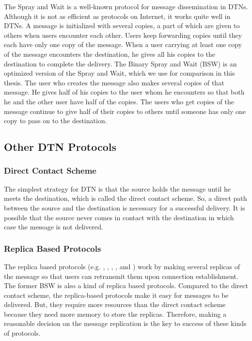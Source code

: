 \noindent The Spray and Wait \cite{C31} is a well-known protocol for message dissemination in DTNs. Although it is not as efficient as protocols on Internet, it works quite well in DTNs. A message is initialized with several copies, a part of which are given to others when users encounter each other. Users keep forwarding copies until they each have only one copy of the message. When a user carrying at least one copy of the message encounters the destination, he gives all his copies to the destination to complete the delivery. The Binary Spray and Wait (BSW) \cite{C31} is an optimized version of the Spray and Wait, which we use for comparison in this thesis. The user who creates the message also makes several copies of that message. He gives half of his copies to the user whom he encounters so that both he and the other user have half of the copies. The users who get copies of the message continue to give half of their copies to others until someone has only one copy to pass on to the destination.

\subsection{ Other DTN Protocols}


\subsubsection{ Direct Contact Scheme}

\noindent The simplest strategy for DTN is that the source holds the message until he meets the destination, which is called the direct contact scheme. So, a direct path between the source and the destination is necessary for a successful delivery. It is possible that the source never comes in contact with the destination in which case the message is not delivered. 


\subsubsection{ Replica Based Protocols}

\noindent The replica based protocols (e.g. \cite{C6}, \cite{C7}, \cite{C8}, \cite{C9}, and \cite{C10}) work by making several replicas of the message so that users can retransmit them upon connection establishment. The former BSW is also a kind of replica based protocols. Compared to the direct contact scheme, the replica-based protocols make it easy for messages to be delivered. But, they require more resources than the direct contact scheme because they need more memory to store the replicas. Therefore, making a reasonable decision on the message replication is the key to success of these kinds of protocols.


